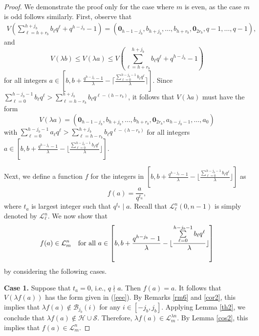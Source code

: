 \documentclass[journal,onecolumn]{IEEEtran}
\begin{document}
\begin{proof}
We demonstrate the proof only for the case where 
$m$ is even, as the case   $m $ is odd follows similarly. First,
observe that  
\begin{equation*}
\begin{split}    V\left(\sum\limits_{\ell=h+r_b}^{h+j_b}b_{\ell}q^{\ell}+q^{h-j_{b}}-1\right) 
    = (\mathbf{0}_{h-1-j_b}, b_{h+j_b},\ldots,b_{h+r_b}, \mathbf{0}_{2r_b}, q-1,\ldots,q-1),
    \end{split}
\end{equation*} and 
 \begin{equation*}
     V(\lambda b)\leq V(\lambda a)\leq V\left(\sum\limits_{\ell=h+r_b}^{h+j_b}b_{\ell}q^{\ell}+q^{h-j_{b}}-1\right)
     \end{equation*}
     for all integers  $a\in \left[b,b+ \frac{q^{h-j_b}-1}{\lambda}-\lceil \frac{\sum\limits_{\ell=0}^{h-j_{b}-1}b_{\ell}q^{\ell}}{\lambda}\rceil  \right]$.  
 Since $\sum\limits_{\ell=0}^{h-j_b-1}b_{\ell}q^{\ell}>\sum\limits_{\ell=h-r_{b}}^{h+j_{b}}b_{\ell}q^{\ell-(h-r_{b})}$, it follows that  $V(\lambda a)$ must have the form 
\begin{equation}\label{eee}  
V(\lambda a)=(\mathbf{0}_{h-1-j_b}, b_{h+j_b}, \ldots, b_{h+r_b}, \mathbf{0}_{2r_{b}},a_{h-j_b-1},\ldots,a_0)\end{equation}
with $\sum\limits_{\ell=0}^{h-j_b-1}a_{\ell}q^{\ell}>\sum\limits_{\ell=h-r_{b}}^{h+j_{b}}b_{\ell}q^{\ell-(h-r_{b})}$ for all integers  $a\in \left[b,b+ \frac{q^{h-j_b}-1}{\lambda}-\lfloor \frac{\sum\limits_{\ell=0}^{h-j_{b}-1}b_{\ell}q^{\ell}}{\lambda}\rfloor   \right]$.  

Next, we 
define a  function $f$ for the  integers in $ \left[b,b+ \frac{q^{h-j_b}-1}{\lambda}-\lfloor \frac{\sum\limits_{\ell=0}^{h-j_{b}-1}b_{\ell}q^{\ell}}{\lambda}\rfloor   \right]$  as 
\begin{equation*}
    f(a)= \frac{a}{q^{t_a}},
\end{equation*}
where $t_a$ is largest integer such that $q^{t_a}\mid a$. Recall that  $\mathcal{L}^n_{\ell}(0,n-1) $ is simply denoted by $\mathcal{L}^n_{\ell}$. 
 We now show that \begin{equation}\label{HAHA}
f(a)\in \mathcal{L}^n_m \quad \hbox{for all } a\in  \left[b,b+ \frac{q^{h-j_b}-1}{\lambda}-\lfloor \frac{\sum\limits_{\ell=0}^{h-j_{b}-1}b_{\ell}q^{\ell}}{\lambda}\rfloor   \right]
\end{equation} by considering the following cases.

\textbf{Case 1.} Suppose that $t_a=0$, i.e., $q\nmid a$. Then  $ f(a)= a$. It follows that   $V(\lambda f(a))$ has the form given in  (\ref{eee}). 
By Remarks \ref{rm6} and \ref{cor2},  this implies that 
$\lambda f(a)\not \in \mathcal{B}_{j_b}(i)$ for any $i\in [-j_b,j_b]$. Applying Lemma  \ref{th2}, we  conclude that  
$\lambda f(a) \not \in \mathcal{H}\cup \mathcal{S}$.  
Therefore,   $\lambda f(a) \in \mathcal{L}_m^{\lambda n}$.  By Lemma \ref{cos2}, this implies that $f(a)\in \mathcal{L}^n_m$. 


\end{proof}
\end{document}
